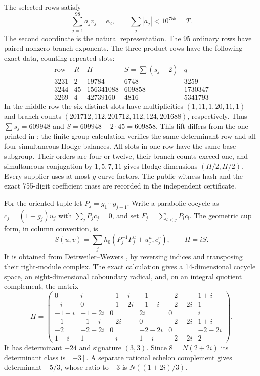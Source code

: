\documentclass[11pt]{article}
\theoremstyle{definition}
\theoremstyle{remark}
\begin{document}
The selected rows satisfy
\begin{equation}\label{eq:gaussian-discriminant-identity}
             \sum_{j=1}^{98}a_jv_j=e_2,\qquad
             \sum_j|a_j|<10^{755}=T.
\end{equation}
The second coordinate is the natural representation.
The 95 ordinary rows have paired nonzero branch exponents.
The three product rows have the following exact data, counting repeated
slots:
\[
\begin{array}{c|r|r|r|r}
 \text{row}&R&H&S=\sum(s_j-2)&q\\ \hline
 3231&2&19784&6748&3259\\
 3244&45&156341088&609858&1730347\\
 3269&4&42739160&4816&5341793
\end{array}
\]
In the middle row the six distinct slots have multiplicities
$(1,11,1,20,11,1)$ and branch counts
$(201712,112,201712,112,124,201688)$, respectively.
Thus $\sum s_j=609948$ and $S=609948-2\cdot45=609858$.
This lift differs from the one printed in
\cite[Table~4]{SevernGaussian}; the finite group calculation verifies
the same determinant row and all four simultaneous Hodge balances.
All slots in one row have the same base subgroup.
Their orders are four or twelve, their branch counts exceed one,
and simultaneous conjugation by $1,5,7,11$ gives Hodge dimensions
$(H/2,H/2)$.  Every supplier uses at most $g$ curve factors.
The public witness hash and the exact 755-digit coefficient mass are
recorded in the independent certificate.

For the oriented tuple let $P_j=g_1\cdots g_{j-1}$.
Write a parabolic cocycle as $c_j=(1-g_j)u_j$ with
$\sum_jP_jc_j=0$, and set $F_j=\sum_{l<j}P_lc_l$.
The geometric cup form, in column convention, is
\[
 S(u,v)=\sum_jh_0(P_j^{-1}F_j^u+u_j^u,c_j^v),\qquad H=iS.
\]
It is obtained from Dettweiler--Wewers \cite[Theorem~2.6, p.~158]{DettweilerWewersPoincare}, by reversing
indices and transposing their right-module complex.
The exact calculation gives a 14-dimensional cocycle space,
an eight-dimensional coboundary radical, and, on an integral quotient
complement, the matrix
\begin{equation}\label{eq:gaussian-discriminant-cup}
 H=\begin{pmatrix}
0&i&-1-i&-1&-2&1+i\\
-i&0&-1-2i&-1-i&-2+2i&1\\
-1+i&-1+2i&0&2i&0&i\\
-1&-1+i&-2i&0&-2+2i&1+i\\
-2&-2-2i&0&-2-2i&0&-2-2i\\
1-i&1&-i&1-i&-2+2i&2
 \end{pmatrix}.
\end{equation}
It has determinant $-24$ and signature $(3,3)$.
Since $8=N(2+2i)$ its determinant class is $[-3]$.
A separate rational echelon complement gives determinant $-5/3$,
whose ratio to $-3$ is $N((1+2i)/3)$.
\end{document}
